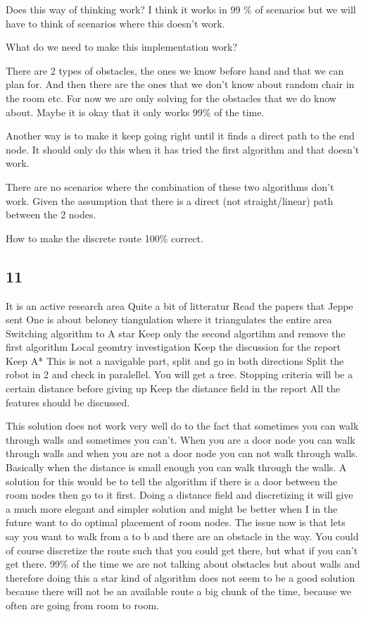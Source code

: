 Does this way of thinking work?
I think it works in 99 \% of scenarios but we will have to think of scenarios where this doesn't work.

What do we need to make this implementation work?

There are 2 types of obstacles, the ones we know before hand and that we can plan for.
And then there are the ones that we don't know about random chair in the room etc.
For now we are only solving for the obstacles that we do know about.
Maybe it is okay that it only works 99\% of the time.

Another way is to make it keep going right until it finds a direct path to the end node.
It should only do this when it has tried the first algorithm and that doesn't work.

There are no scenarios where the combination of these two algorithms don't work.
Given the assumption that there is a direct (not straight/linear) path between the 2 nodes.

How to make the discrete route 100\% correct.

\subsection{11}
It is an active research area
Quite a bit of litteratur 
Read  the papers that Jeppe sent
One is about beloney tiangulation where it triangulates the entire area
Switching algorithm to A star
Keep only the second algortihm and remove the first algorithm
Local geomtry investigation
Keep the discussion for the report
Keep A*
This is not a navigable part, split and go in both directions
Split the robot in 2 and check in paralellel. You will get a tree.
Stopping criteria  will be a certain distance before giving up
Keep the distance field in the report
All the features should be discussed. 

This solution does not work very well do to the fact that sometimes you can walk through walls and sometimes you can't. When you are a door node you can walk through walls and when you are not a door node you can not walk through walls. Basically when the distance is small enough you can walk through the walls.
A solution for this would be to tell the algorithm if there is a door between the room nodes then go to it first.
Doing a distance field and discretizing it will give a much more elegant and simpler solution and might be better when I in the future want to do optimal placement of room nodes.
The issue now is that lets say you want to walk from a to b and there are an obstacle in the way. You could of course discretize the route such that you could get there, but what if you can't get there.
99\% of the time we are not talking about obstacles but about walls and therefore doing this a star kind of algorithm does not seem to be a good solution because there will not be an available route a big chunk of the time, because we often are going from room to room. 

